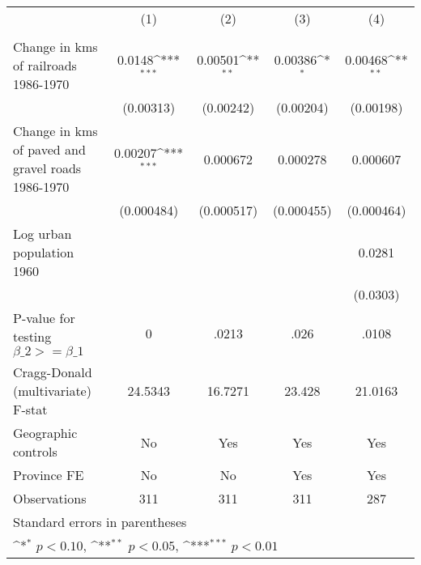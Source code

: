 {
\def\sym#1{\ifmmode^{#1}\else\(^{#1}\)\fi}
\begin{tabular}{l*{4}{c}}
\hline\hline
                &\multicolumn{1}{c}{(1)}&\multicolumn{1}{c}{(2)}&\multicolumn{1}{c}{(3)}&\multicolumn{1}{c}{(4)}\\
                &\multicolumn{1}{c}{}&\multicolumn{1}{c}{}&\multicolumn{1}{c}{}&\multicolumn{1}{c}{}\\
\hline
Change in kms of railroads 1986-1970&   0.0148\sym{***}&  0.00501\sym{**} &  0.00386\sym{*}  &  0.00468\sym{**} \\
                &(0.00313)         &(0.00242)         &(0.00204)         &(0.00198)         \\
[1em]
Change in kms of paved and gravel roads 1986-1970&  0.00207\sym{***}& 0.000672         & 0.000278         & 0.000607         \\
                &(0.000484)         &(0.000517)         &(0.000455)         &(0.000464)         \\
[1em]
Log urban population 1960&                  &                  &                  &   0.0281         \\
                &                  &                  &                  & (0.0303)         \\
\hline
P-value for testing $\beta\_{2} >= \beta\_{1}$&        0         &    .0213         &     .026         &    .0108         \\
Cragg-Donald (multivariate) F-stat&  24.5343         &  16.7271         &   23.428         &  21.0163         \\
Geographic controls&       No         &      Yes         &      Yes         &      Yes         \\
Province FE     &       No         &       No         &      Yes         &      Yes         \\
Observations    &      311         &      311         &      311         &      287         \\
\hline\hline
\multicolumn{5}{l}{\footnotesize Standard errors in parentheses}\\
\multicolumn{5}{l}{\footnotesize \sym{*} \(p<0.10\), \sym{**} \(p<0.05\), \sym{***} \(p<0.01\)}\\
\end{tabular}
}
